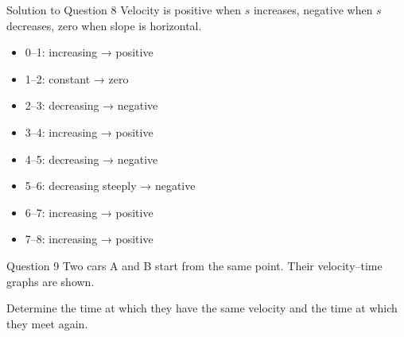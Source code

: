 \documentclass{beamer}
\begin{document}
\begin{frame}[shrink=15]{Solution to Question 8}
Velocity is positive when $s$ increases, negative when $s$ decreases, zero when slope is horizontal.
\begin{itemize}
    \item 0–1: increasing → positive
    \item 1–2: constant → zero
    \item 2–3: decreasing → negative
    \item 3–4: increasing → positive
    \item 4–5: decreasing → negative
    \item 5–6: decreasing steeply → negative
    \item 6–7: increasing → positive
    \item 7–8: increasing → positive
\end{itemize}
\end{frame}

\begin{frame}[shrink=15]{Question 9}
Two cars A and B start from the same point. Their velocity–time graphs are shown.
\begin{center}
\end{center}
Determine the time at which they have the same velocity and the time at which they meet again.
\end{frame}
\end{document}
